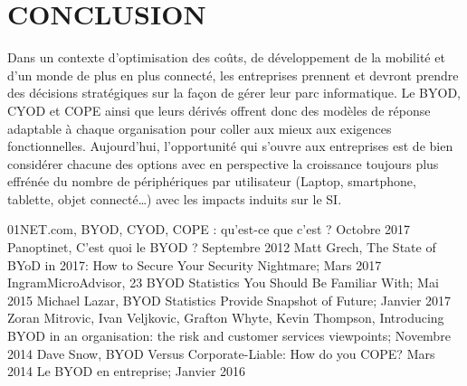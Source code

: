 \documentclass[letterpaper, 11 pt, conference]{ieeeconf}
\begin{document}
\section{CONCLUSION}
Dans un contexte d’optimisation des co\^{u}ts, de d\'{e}veloppement de la mobilit\'{e} et d’un monde de plus en plus connect\'{e}, les entreprises prennent et devront prendre des d\'{e}cisions strat\'{e}giques sur la fa\c con de g\'{e}rer leur parc informatique. Le BYOD, CYOD et COPE ainsi que leurs d\'{e}riv\'{e}s offrent donc des mod\`{e}les de r\'{e}ponse adaptable \`{a} chaque organisation pour coller aux mieux aux exigences fonctionnelles. Aujourd'hui, l'opportunit\'{e} qui s’ouvre aux entreprises est de bien consid\'{e}rer chacune des options avec en perspective la croissance toujours plus effr\'{e}n\'{e}e du nombre de p\'{e}riph\'{e}riques par utilisateur (Laptop, smartphone, tablette, objet connect\'{e}…) avec les impacts induits sur le SI.

\addtolength{\textheight}{-12cm}

\begin{thebibliography}{99}
 01NET.com, BYOD, CYOD, COPE : qu'est-ce que c'est ? Octobre 2017
 Panoptinet, C’est quoi le BYOD ? Septembre 2012
 Matt Grech, The State of BYoD in 2017: How to Secure Your Security Nightmare; Mars 2017
 IngramMicroAdvisor, 23 BYOD Statistics You Should Be Familiar With; Mai 2015
 Michael Lazar, BYOD Statistics Provide Snapshot of Future; Janvier 2017
 Zoran Mitrovic, Ivan Veljkovic, Grafton Whyte, Kevin Thompson, Introducing BYOD in an organisation: the risk and customer services viewpoints; Novembre 2014
 Dave Snow, BYOD Versus Corporate-Liable: How do you COPE? Mars 2014
 Le BYOD en entreprise; Janvier 2016
\end{thebibliography}
\end{document}
